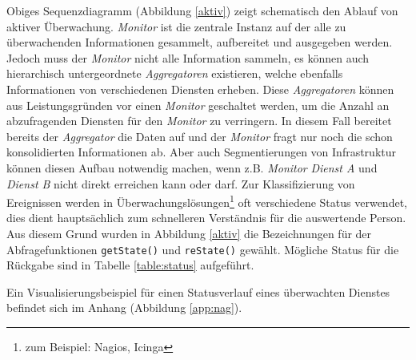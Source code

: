 Obiges Sequenzdiagramm (Abbildung \ref{aktiv}) zeigt schematisch den Ablauf von aktiver 
Überwachung. \emph{Monitor} ist die zentrale Instanz auf der alle zu überwachenden 
Informationen gesammelt, aufbereitet und ausgegeben werden. Jedoch muss der 
\emph{Monitor} nicht alle Information sammeln, es können auch hierarchisch untergeordnete 
\emph{Aggregatoren} existieren, welche ebenfalls Informationen von verschiedenen Diensten 
erheben. Diese \emph{Aggregatoren} können aus Leistungsgründen vor einen \emph{Monitor} 
geschaltet werden, um die Anzahl an abzufragenden Diensten für den \emph{Monitor} zu 
verringern. In diesem Fall bereitet bereits der \emph{Aggregator} die Daten auf und der 
\emph{Monitor} fragt nur noch die schon konsolidierten Informationen ab. Aber auch 
Segmentierungen von Infrastruktur können diesen Aufbau notwendig machen, wenn z.B. 
\emph{Monitor} \emph{Dienst A} und \emph{Dienst B} nicht direkt erreichen kann oder darf. 
Zur Klassifizierung von Ereignissen werden in Überwachungslösungen\footnote{zum Beispiel: 
Nagios, Icinga} oft verschiedene Status verwendet, dies dient hauptsächlich zum 
schnelleren Verständnis für die auswertende Person. Aus diesem Grund wurden in 
Abbildung \ref{aktiv} die Bezeichnungen für der Abfragefunktionen \texttt{getState()} und 
\texttt{reState()} gewählt. Mögliche Status für die Rückgabe sind in Tabelle 
\ref{table:status} aufgeführt.

\begin{table}[ht]
    \caption{Statusübersicht}
    \label{table:status}\vspace{0.2cm}

\end{table}
Ein Visualisierungsbeispiel für einen Statusverlauf eines überwachten Dienstes befindet 
sich im Anhang (Abbildung \ref{app:nag}).

